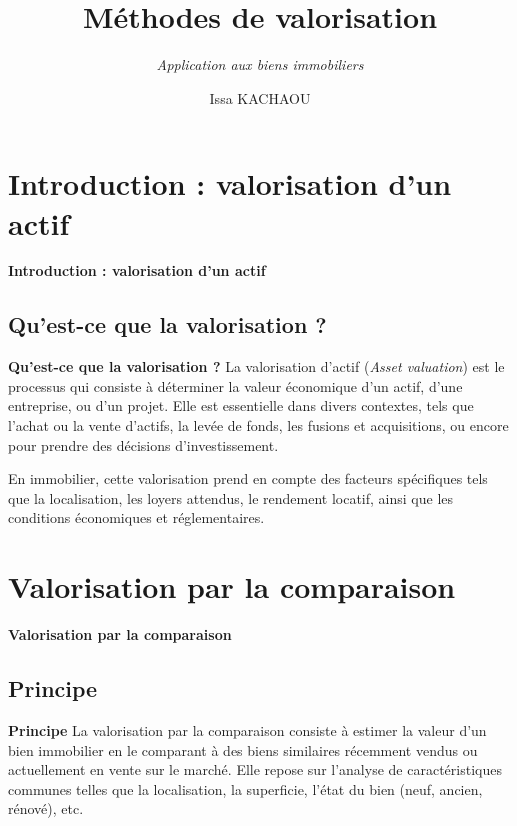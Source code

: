 \documentclass{beamer}
\title{Méthodes de valorisation}
\subtitle{\textit{Application aux biens immobiliers}}
\author{Issa KACHAOU}
\begin{document}
	\begin{frame}[plain]
		\maketitle
	\end{frame}

\section{Introduction : valorisation d'un actif}	
	\begin{frame}{\textbf{Introduction : valorisation d'un actif}}
		\subsection{Qu'est-ce que la valorisation ?}
		\begin{block}{\textbf{Qu'est-ce que la valorisation ?}}{}
La valorisation d'actif (\textit{Asset valuation}) est le processus qui consiste à déterminer la valeur économique d’un actif, d’une entreprise, ou d’un projet. Elle est essentielle dans divers contextes, tels que l’achat ou la vente d’actifs, la levée de fonds, les fusions et acquisitions, ou encore pour prendre des décisions d’investissement.
		\end{block}

\begin{block}

En immobilier, cette valorisation prend en compte des facteurs spécifiques tels que la localisation, les loyers attendus, le rendement locatif, ainsi que les conditions économiques et réglementaires.
\end{block}



	\end{frame}
	
\section{Valorisation par la comparaison}	
	
\begin{frame}{\textbf{Valorisation par la comparaison}}
	
\subsection{Principe}	
\begin{block}{\textbf{Principe}}
	La valorisation par la comparaison consiste à estimer la valeur d’un bien immobilier en le comparant à des biens similaires récemment vendus ou actuellement en vente sur le marché. Elle repose sur l’analyse de caractéristiques communes telles que la localisation, la superficie, l’état du bien  (neuf, ancien, rénové), etc.
\end{block}	
	
\end{frame}
\end{document}
